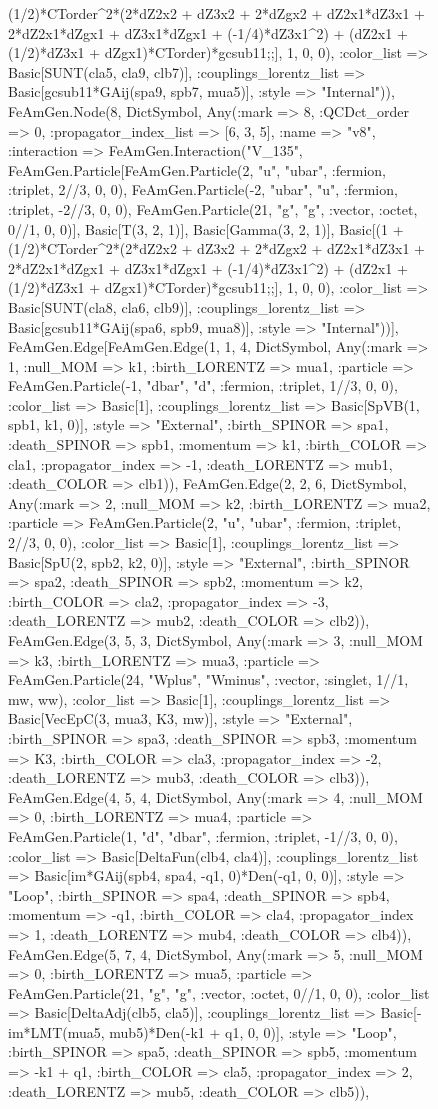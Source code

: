 \documentclass{revtex4}
\begin{document}
\begin{figure}[!htb]
\begin{center}
{(1/2)*CTorder^2*(2*dZ2x2 + dZ3x2 + 2*dZgx2 + dZ2x1*dZ3x1 + 2*dZ2x1*dZgx1 + dZ3x1*dZgx1 + (-1/4)*dZ3x1^2) + (dZ2x1 + (1/2)*dZ3x1 + dZgx1)*CTorder)*gcsub11;;], 1, 0, 0), :color_list => Basic[SUNT(cla5, cla9, clb7)], :couplings_lorentz_list => Basic[gcsub11*GAij(spa9, spb7, mua5)], :style => "Internal")), FeAmGen.Node(8, Dict{Symbol, Any}(:mark => 8, :QCDct_order => 0, :propagator_index_list => [6, 3, 5], :name => "v8", :interaction => FeAmGen.Interaction("V_135", FeAmGen.Particle[FeAmGen.Particle(2, "u", "ubar", :fermion, :triplet, 2//3, 0, 0), FeAmGen.Particle(-2, "ubar", "u", :fermion, :triplet, -2//3, 0, 0), FeAmGen.Particle(21, "g", "g", :vector, :octet, 0//1, 0, 0)], Basic[T(3, 2, 1)], Basic[Gamma(3, 2, 1)], Basic[(1 + (1/2)*CTorder^2*(2*dZ2x2 + dZ3x2 + 2*dZgx2 + dZ2x1*dZ3x1 + 2*dZ2x1*dZgx1 + dZ3x1*dZgx1 + (-1/4)*dZ3x1^2) + (dZ2x1 + (1/2)*dZ3x1 + dZgx1)*CTorder)*gcsub11;;], 1, 0, 0), :color_list => Basic[SUNT(cla8, cla6, clb9)], :couplings_lorentz_list => Basic[gcsub11*GAij(spa6, spb9, mua8)], :style => "Internal"))], FeAmGen.Edge[FeAmGen.Edge(1, 1, 4, Dict{Symbol, Any}(:mark => 1, :null_MOM => k1, :birth_LORENTZ => mua1, :particle => FeAmGen.Particle(-1, "dbar", "d", :fermion, :triplet, 1//3, 0, 0), :color_list => Basic[1], :couplings_lorentz_list => Basic[SpVB(1, spb1, k1, 0)], :style => "External", :birth_SPINOR => spa1, :death_SPINOR => spb1, :momentum => k1, :birth_COLOR => cla1, :propagator_index => -1, :death_LORENTZ => mub1, :death_COLOR => clb1)), FeAmGen.Edge(2, 2, 6, Dict{Symbol, Any}(:mark => 2, :null_MOM => k2, :birth_LORENTZ => mua2, :particle => FeAmGen.Particle(2, "u", "ubar", :fermion, :triplet, 2//3, 0, 0), :color_list => Basic[1], :couplings_lorentz_list => Basic[SpU(2, spb2, k2, 0)], :style => "External", :birth_SPINOR => spa2, :death_SPINOR => spb2, :momentum => k2, :birth_COLOR => cla2, :propagator_index => -3, :death_LORENTZ => mub2, :death_COLOR => clb2)), FeAmGen.Edge(3, 5, 3, Dict{Symbol, Any}(:mark => 3, :null_MOM => k3, :birth_LORENTZ => mua3, :particle => FeAmGen.Particle(24, "Wplus", "Wminus", :vector, :singlet, 1//1, mw, ww), :color_list => Basic[1], :couplings_lorentz_list => Basic[VecEpC(3, mua3, K3, mw)], :style => "External", :birth_SPINOR => spa3, :death_SPINOR => spb3, :momentum => K3, :birth_COLOR => cla3, :propagator_index => -2, :death_LORENTZ => mub3, :death_COLOR => clb3)), FeAmGen.Edge(4, 5, 4, Dict{Symbol, Any}(:mark => 4, :null_MOM => 0, :birth_LORENTZ => mua4, :particle => FeAmGen.Particle(1, "d", "dbar", :fermion, :triplet, -1//3, 0, 0), :color_list => Basic[DeltaFun(clb4, cla4)], :couplings_lorentz_list => Basic[im*GAij(spb4, spa4, -q1, 0)*Den(-q1, 0, 0)], :style => "Loop", :birth_SPINOR => spa4, :death_SPINOR => spb4, :momentum => -q1, :birth_COLOR => cla4, :propagator_index => 1, :death_LORENTZ => mub4, :death_COLOR => clb4)), FeAmGen.Edge(5, 7, 4, Dict{Symbol, Any}(:mark => 5, :null_MOM => 0, :birth_LORENTZ => mua5, :particle => FeAmGen.Particle(21, "g", "g", :vector, :octet, 0//1, 0, 0), :color_list => Basic[DeltaAdj(clb5, cla5)], :couplings_lorentz_list => Basic[-im*LMT(mua5, mub5)*Den(-k1 + q1, 0, 0)], :style => "Loop", :birth_SPINOR => spa5, :death_SPINOR => spb5, :momentum => -k1 + q1, :birth_COLOR => cla5, :propagator_index => 2, :death_LORENTZ => mub5, :death_COLOR => clb5)), }
\end{center}
\end{figure}
\end{document}
